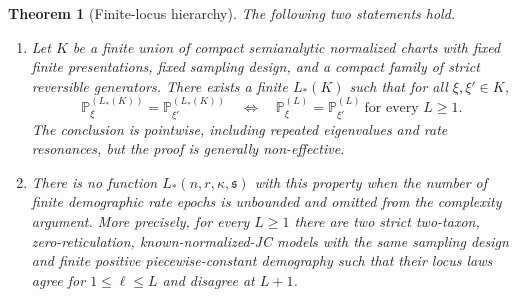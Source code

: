 \documentclass[11pt]{article}
\newtheorem{theorem}{Theorem}[section]
\begin{document}
\begin{theorem}[Finite-locus hierarchy]
\label{thm:finite-hierarchy}
The following two statements hold.
\begin{enumerate}[label=(\alph*)]
\item Let $K$ be a finite union of compact semianalytic normalized charts with fixed finite presentations, fixed sampling design, and a compact family of strict reversible generators.  There exists a finite $L_*(K)$ such that for all $\xi,\xi'\in K$,
\[
\mathbb P_\xi^{(L_*(K))}=\mathbb P_{\xi'}^{(L_*(K))}
\quad\Longleftrightarrow\quad
\mathbb P_\xi^{(L)}=\mathbb P_{\xi'}^{(L)}\ \text{for every }L\ge1.
\]
The conclusion is pointwise, including repeated eigenvalues and rate resonances, but the proof is generally non-effective.
\item There is no function $L_*(n,r,\kappa,\mathfrak s)$ with this property when the number of finite demographic rate epochs is unbounded and omitted from the complexity argument.  More precisely, for every $L\ge1$ there are two strict two-taxon, zero-reticulation, known-normalized-JC models with the same sampling design and finite positive piecewise-constant demography such that their locus laws agree for $1\le\ell\le L$ and disagree at $L+1$.
\end{enumerate}
\end{theorem}
\end{document}
